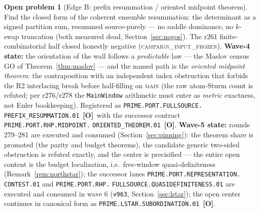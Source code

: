 \documentclass[11pt]{article}
\newcommand{\mO}{\textcolor{openred}{\textbf{[O]}}}
\theoremstyle{definition}
\newtheorem{openproblem}[theorem]{Open problem}
\theoremstyle{remark}
\begin{document}
\begin{openproblem}[Edge B: prefix resummation / oriented midpoint theorem]
Find the closed form of the coherent ensemble resummation: the determinant
as a signed partition sum, resummed source-purely --- no saddle dominance,
no $k$-swap truncation (both measured dead, Section~\ref{sec:nogos}).
The r261 finite-combinatorial half closed honestly negative
(\textsc{campaign\_input\_frozen}).  \textbf{Wave-4 state:} the
orientation of the wall follows a \emph{predictable} law --- the Maslov
census GO of Theorem~\ref{thm:maslov} --- and the named path is the
\emph{oriented midpoint theorem}: the contraposition with an independent
index obstruction that forbids the R2 interlacing break before
half-filling on \textsc{main} (the raw atom-Sturm count is refuted; per
r276/r278 the \texttt{MainWindow} arithmetic must enter as \emph{metric}
exactness, not Euler bookkeeping).  Registered as
\texttt{PRIME.PORT.FULLSOURCE.}\allowbreak
\texttt{PREFIX\_RESUMMATION.01}~\mO\ with the successor contract
\texttt{PRIME.PORT.RHP.MIDPOINT.}\allowbreak
\texttt{ORIENTED\_THEOREM.01}~\mO.  \textbf{Wave-5 state:} rounds
279--281 are executed and consumed
(Section~\ref{sec:pinning}): the theorem share is promoted (the parity
and budget theorems), the candidate generic two-sided obstruction is
refuted exactly, and the center is precisified --- the entire open
content is the budget localization, i.e.\ free-window
quasi-definiteness (Remark~\ref{rem:northstar}); the successor lanes
\texttt{PRIME.PORT.}\allowbreak\texttt{REPRESENTATION.}\allowbreak
\texttt{CONTEST.01} and \texttt{PRIME.PORT.RHP.}\allowbreak
\texttt{FULLSOURCE.}\allowbreak\texttt{QUASIDEFINITENESS.01}
are executed and consumed in wave 6 (\texttt{v963},
Section~\ref{sec:lstar}); the open center continues in canonical form
as \texttt{PRIME.LSTAR.SUBORDINATION.01}~\mO.
\end{openproblem}
\end{document}

